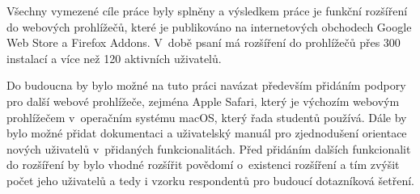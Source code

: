 Všechny vymezené cíle práce byly splněny a výsledkem práce je funkční rozšíření do webových prohlížečů, které je publikováno na internetových obchodech Google Web Store a Firefox Addons. V~době psaní má rozšíření do prohlížečů přes 300 instalací a více než 120 aktivních uživatelů. 

\clearpage
Do budoucna by bylo možné na tuto práci navázat především přidáním podpory pro další webové prohlížeče, zejména Apple Safari, který je výchozím webovým prohlížečem v~operačním systému macOS, který řada studentů používá. Dále by bylo možné přidat dokumentaci a uživatelský manuál pro zjednodušení orientace nových uživatelů v~přidaných funkcionalitách. Před přidáním dalších funkcionalit do rozšíření by bylo vhodné rozšířit povědomí o~existenci rozšíření a tím zvýšit počet jeho uživatelů a tedy i vzorku respondentů pro budoucí dotazníková šetření. 
